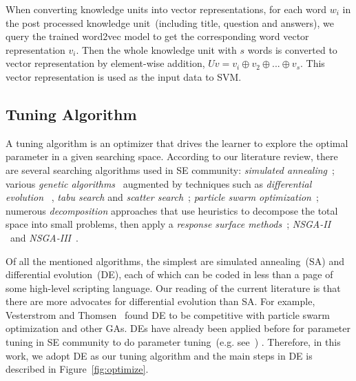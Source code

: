 \documentclass[sigconf]{acmart}
\theoremstyle{break}
\newcommand{\fig}[1]{Figure~\ref{fig:#1}}
\begin{document}
When converting knowledge units into vector representations, 
for each word $w_i$ in the post processed knowledge unit~(including title, question and answers),
we query the trained word2vec model to get the corresponding word vector representation $v_i$.
Then the whole knowledge unit with $s$ words
is converted to vector representation by element-wise addition, $Uv = v_i \oplus v_2 \oplus...\oplus v_s $. 
This vector representation is used
as the input data to SVM.



\subsection{Tuning Algorithm}

A tuning algorithm is an optimizer that  drives the learner to explore
the optimal parameter in a given searching space. According to our
literature review, there are several searching algorithms used in 
SE community:{\em 
simulated annealing}~\cite{feather2002converging,menzies2007data};
 various {\em genetic algorithms}~\cite{jones1996automatic,harman2007current, arcuri2011parameter} augmented by
techniques such as {\em differential evolution}
~\cite{storn1997differential, fu2016tuning, fu2016differential,chaves2015differential,agrawal2016wrong}, 
{\em tabu search} and {\em scatter search}~\cite{beausoleil2006moss,molina2007sspmo,corazza2013using};
{\em particle swarm optimization}~\cite{windisch2007applying}; 
numerous {\em decomposition} approaches that use
    heuristics to decompose the total space into   small problems,   then apply a
    {\em response surface methods}~\cite{krall2015gale};
     {\em NSGA-II} ~\cite{zhang2007multi}and {\em NSGA-III}~\cite{mkaouer2014high}.





Of all the mentioned algorithms,  the simplest are simulated annealing~(SA)  and 
differential evolution~(DE), each of which can be coded in less than a page of some high-level scripting language.
 Our reading of the current literature is that there are more  advocates for
differential evolution than SA. For example,  Vesterstrom and Thomsen~\cite{Vesterstrom04} found DE to be competitive with 
 particle swarm optimization and other GAs.  DEs have already been applied before for 
 parameter tuning in SE community to do parameter tuning~(e.g. see~\cite{omran2005differential, chiha2012tuning, fu2016tuning, fu2016differential, agrawal2016wrong}) .
Therefore, in this work, we adopt DE as our tuning algorithm and 
the main steps in DE is described in \fig{optimize}.
\end{document}
